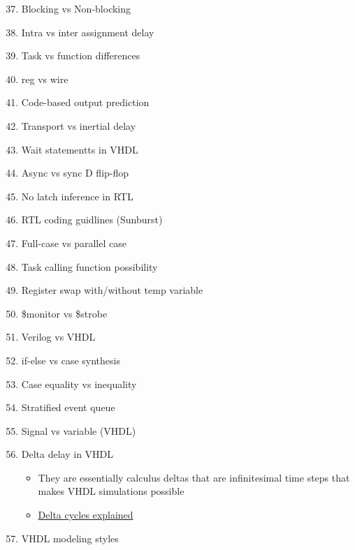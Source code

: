 \documentclass[main.tex]{subfiles}
\begin{document}
\begin{enumerate}
    \setcounter{enumi}{36}
    \item Blocking vs Non-blocking
    \item Intra vs inter assignment delay
    \item Task vs function differences
    \item reg vs wire
    \item Code-based output prediction
    \item Transport vs inertial delay
    \item Wait statementts in VHDL
    \item Async vs sync D flip-flop
    \item No latch inference in RTL
    \item RTL coding guidlines (Sunburst)
    \item Full-case vs parallel case
    \item Task calling function possibility
    \item Register swap with/without temp variable
    \item \$monitor vs \$strobe
    \item Verilog vs VHDL
    \item if-else vs case synthesis
    \item Case equality vs inequality
    \item Stratified event queue
    \item Signal vs variable (VHDL)
    \item Delta delay in VHDL
    \begin{itemize}
        \item They are essentially calculus deltas that are infinitesimal time steps that makes VHDL simulations possible
        \item \href{https://vhdlwhiz.com/delta-cycles-explained/}{Delta cycles explained}
    \end{itemize}
    \item VHDL modeling styles
\end{enumerate}
\end{document}

